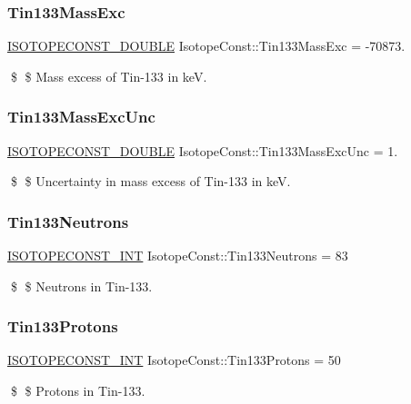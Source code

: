 \subsubsection{\texorpdfstring{Tin133\+Mass\+Exc}{Tin133MassExc}}
{\footnotesize\ttfamily \mbox{\hyperlink{group___isotope_const-_macros_ga8f45a7272ce02c0b4c65c44636ed719a}{I\+S\+O\+T\+O\+P\+E\+C\+O\+N\+S\+T\+\_\+\+D\+O\+U\+B\+LE}} Isotope\+Const\+::\+Tin133\+Mass\+Exc = -\/70873.}

\$ \$ Mass excess of Tin-\/133 in keV. \mbox{\label{group___isotope_const-_tin-_sn133_gaade495a0921d98104a8b3d17b5a2c26a}} 
\subsubsection{\texorpdfstring{Tin133\+Mass\+Exc\+Unc}{Tin133MassExcUnc}}
{\footnotesize\ttfamily \mbox{\hyperlink{group___isotope_const-_macros_ga8f45a7272ce02c0b4c65c44636ed719a}{I\+S\+O\+T\+O\+P\+E\+C\+O\+N\+S\+T\+\_\+\+D\+O\+U\+B\+LE}} Isotope\+Const\+::\+Tin133\+Mass\+Exc\+Unc = 1.}

\$ \$ Uncertainty in mass excess of Tin-\/133 in keV. \mbox{\label{group___isotope_const-_tin-_sn133_ga2b5ff7b353e15d0d59009944fee38d85}} 
\subsubsection{\texorpdfstring{Tin133\+Neutrons}{Tin133Neutrons}}
{\footnotesize\ttfamily \mbox{\hyperlink{group___isotope_const-_macros_ga5f18360b3e99483a35c32d789e62621c}{I\+S\+O\+T\+O\+P\+E\+C\+O\+N\+S\+T\+\_\+\+I\+NT}} Isotope\+Const\+::\+Tin133\+Neutrons = 83}

\$ \$ Neutrons in Tin-\/133. \mbox{\label{group___isotope_const-_tin-_sn133_ga76463822a324c4acb850170efb728c85}} 
\subsubsection{\texorpdfstring{Tin133\+Protons}{Tin133Protons}}
{\footnotesize\ttfamily \mbox{\hyperlink{group___isotope_const-_macros_ga5f18360b3e99483a35c32d789e62621c}{I\+S\+O\+T\+O\+P\+E\+C\+O\+N\+S\+T\+\_\+\+I\+NT}} Isotope\+Const\+::\+Tin133\+Protons = 50}

\$ \$ Protons in Tin-\/133. 